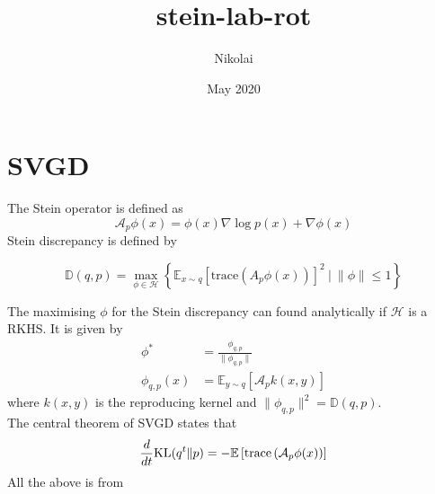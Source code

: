 \documentclass{article}
\title{stein-lab-rot}
\author{Nikolai }
\date{May 2020}
\begin{document}
\maketitle

\section{SVGD}
    The Stein operator is defined as
    \begin{equation}
        \label{eq:stein_operator}
        \mathcal{A}_p \phi(x) = \phi(x) \nabla \log p(x) + \nabla \phi(x)
    \end{equation}
    Stein discrepancy is defined by

    \begin{equation}
        \label{eq:stein_discrepancy}
        \mathbb{D}( q, p ) = \max_{ \phi \in \mathcal{H} } 
        \left\{ 
          \mathbb{E}_{ x \sim q } 
            \left[ 
                \text{trace} ( A_p \phi(x) ) 
            \right]^2
            \ | \ \|\phi\| \leq 1 
        \right\}
    \end{equation}

    The maximising $\phi$ for the Stein discrepancy can found analytically if $\mathcal{H}$ is a RKHS. It is given by
    \begin{align}
        \label{eq:phi_max}
        \phi^* &= \frac{ \phi_{ q, p }} {\|\phi_{ q, p }\| } \\
        \phi_{ q, p } (x) &= \mathbb{E}_{ y \sim q } \left[ \mathcal{A}_p k(x, y) \right]
    \end{align}
    where $k(x,y)$ is the reproducing kernel and $\|\phi_{ q, p }\|^2  = \mathbb{D}(q,p)$.\\
    The central theorem of SVGD states that
    \begin{equation}
        \label{eq:svgd}
        \frac{d}{dt} \textrm{KL}( q^t \| p ) = - \mathbb{E} \left[ \text{trace} \left( \mathcal{A}_p \phi(x) \right) \right]
    \end{equation}
    All the above is from %
\end{document}
